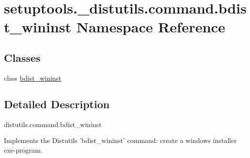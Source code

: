 \hypertarget{namespacesetuptools_1_1__distutils_1_1command_1_1bdist__wininst}{}\section{setuptools.\+\_\+distutils.\+command.\+bdist\+\_\+wininst Namespace Reference}
\label{namespacesetuptools_1_1__distutils_1_1command_1_1bdist__wininst}
\subsection*{Classes}
\begin{DoxyCompactItemize}
\item 
class \hyperlink{classsetuptools_1_1__distutils_1_1command_1_1bdist__wininst_1_1bdist__wininst}{bdist\+\_\+wininst}
\end{DoxyCompactItemize}


\subsection{Detailed Description}
\begin{DoxyVerb}distutils.command.bdist_wininst

Implements the Distutils 'bdist_wininst' command: create a windows installer
exe-program.\end{DoxyVerb}
 